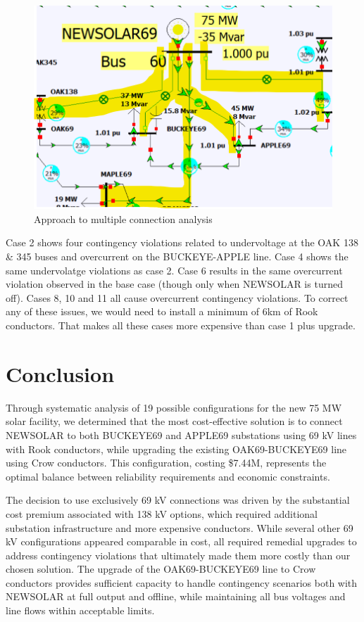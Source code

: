 \documentclass[conference]{IEEEtran}
\begin{document}
\begin{figure}[h]
	\centering
	\includegraphics[width=1\linewidth]{figures/multi}
	\caption{Approach to multiple connection analysis}
	\label{fig:multi}
\end{figure}


Case 2 shows four contingency violations related to undervoltage at the OAK 138 \& 345 buses and overcurrent on the BUCKEYE-APPLE line. Case 4 shows the same undervolatge violations as case 2. Case 6 results in the same overcurrent violation observed in the base case (though only when NEWSOLAR is turned off). Cases 8, 10 and 11 all cause overcurrent contingency violations. To correct any of these issues, we would need to install a minimum of 6km of Rook conductors. That makes all these cases more expensive than case 1 plus upgrade.
\section{Conclusion}
Through systematic analysis of 19 possible configurations for the new 75 MW solar facility, we determined that the most cost-effective solution is to connect NEWSOLAR to both BUCKEYE69 and APPLE69 substations using 69 kV lines with Rook conductors, while upgrading the existing OAK69-BUCKEYE69 line using Crow conductors. This configuration, costing \$7.44M, represents the optimal balance between reliability requirements and economic constraints.

The decision to use exclusively 69 kV connections was driven by the substantial cost premium associated with 138 kV options, which required additional substation infrastructure and more expensive conductors. While several other 69 kV configurations appeared comparable in cost, all required remedial upgrades to address contingency violations that ultimately made them more costly than our chosen solution. The upgrade of the OAK69-BUCKEYE69 line to Crow conductors provides sufficient capacity to handle contingency scenarios both with NEWSOLAR at full output and offline, while maintaining all bus voltages and line flows within acceptable limits.
\end{document}
